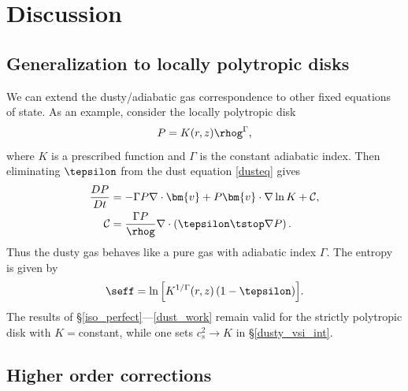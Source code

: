 \section{Discussion}\label{discussion}

\subsection{Generalization to locally polytropic disks}

We can extend the dusty/adiabatic gas correspondence to 
other fixed equations of state. As an example, consider the locally
polytropic disk 
\begin{align}
  P = K(r,z)\rhog^{\Gamma}, 
\end{align}
where $K$ is a prescribed function and $\Gamma$ is the constant
adiabatic index. Then eliminating $\tepsilon$ from the dust equation
\ref{dusteq} gives 
\begin{align}\label{poly_energy}
  \frac{D P}{D t} &= - \Gamma P\nabla\cdot\bm{v}  + P \bm{v}\cdot\nabla
  \ln{K} + \mathcal{C},\\
  \mathcal{C}& = \frac{\Gamma P}{\rhog}\nabla\cdot\left(\tepsilon\tstop\nabla
  P\right).
\end{align}
Thus the dusty gas behaves like a pure gas with adiabatic index
$\Gamma$. The entropy is given by 
\begin{align}
  \seff = \ln{\left[K^{1/\Gamma}(r,z)\left(1 - \tepsilon\right)\right]}.  
\end{align}
The results of \S\ref{iso_perfect}---\ref{dust_work} remain valid for the strictly 
polytropic disk with $K=$constant, while one sets $c_s^2\to K$ in
\S\ref{dusty_vsi_int}. 

\subsection{Higher order corrections}

